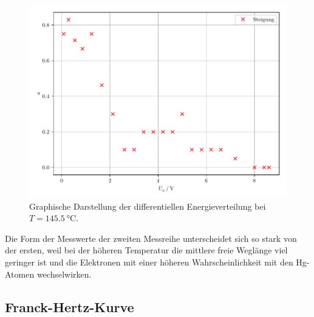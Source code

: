 \begin{figure}[H]
  \includegraphics[width=\textwidth]{plot2.pdf}
  \caption{Graphische Darstellung der differentiellen Energieverteilung bei $T = \SI{145.5}{\celsius}$.}
  \label{abb:4}
\end{figure}

Die Form der Messwerte der zweiten Messreihe unterscheidet sich so stark von der
ersten, weil bei der höheren Temperatur die mittlere freie Weglänge viel geringer ist
und die Elektronen mit einer höheren Wahrscheinlichkeit mit den Hg-Atomen wechselwirken.

\subsection{Franck-Hertz-Kurve}
